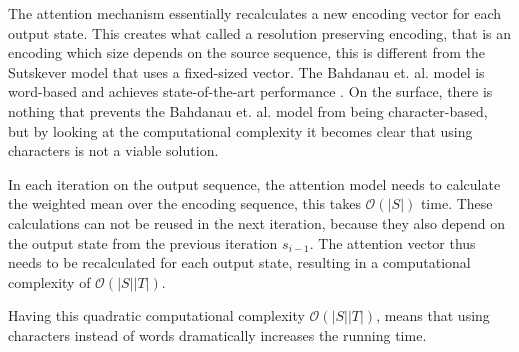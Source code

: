 The attention mechanism essentially recalculates a new encoding vector for each output state. This creates what called a resolution preserving encoding, that is an encoding which size depends on the source sequence, this is different from the Sutskever model that uses a fixed-sized vector. The Bahdanau et. al. model is word-based and achieves state-of-the-art performance \cite{bahdanau-2015-nmt}. On the surface, there is nothing that prevents the Bahdanau et. al. model from being character-based, but by looking at the computational complexity it becomes clear that using characters is not a viable solution.

In each iteration on the output sequence, the attention model needs to calculate the weighted mean over the encoding sequence, this takes $\mathcal{O}(|S|)$ time. These calculations can not be reused in the next iteration, because they also depend on the output state from the previous iteration $s_{i-1}$. The attention vector thus needs to be recalculated for each output state, resulting in a computational complexity of $\mathcal{O}(|S||T|)$.

Having this quadratic computational complexity $\mathcal{O}(|S||T|)$, means that using characters instead of words dramatically increases the running time.
